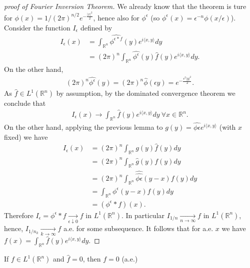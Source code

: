 \begin{proof}[proof of Fourier Inversion Theorem]
    We already know that the theorem is ture for \(\phi(x) = 1/(2\pi)^{n/2}e^{-\frac{|x|^2}{2}}\), hence also for \(\phi^{\epsilon}\) (so \(\phi^{\epsilon}(x) = \epsilon^{-n}\phi(x/\epsilon)\)). Consider the function \(I_{\epsilon}\) defined by 
    \begin{align*}
        I_{\epsilon}(x) &= \int_{\mathbb{R}^n} \widehat{\phi^{\epsilon\ast f}}(y)e^{i\langle x,y\rangle}dy \\
        &= (2\pi)^n\int_{\mathbb{R}^n} \widehat{\phi^{\epsilon}} (y) \hat{f}(y) e^{i\langle x,y \rangle}dy.
    \end{align*}
    On the other hand, 
    \begin{align*}
        (2\pi)^n\widehat{\phi^{\epsilon}}(y) = (2\pi)^n\hat{\phi}(\epsilon y) = e^{-\frac{\epsilon^2|y|^2}{2}}.
    \end{align*}
    As \(\hat{f}\in L^1(\mathbb{R}^n)\) by assumption, by the dominated convergence theorem we conclude that 
    \begin{align*}
        I_{\epsilon}(x) \rightarrow \int_{\mathbb{R}^n} \hat{f}(y)e^{i\langle x,y\rangle}dy \ \forall x\in\mathbb{R}^n.
    \end{align*}
    On the other hand, applying the previous lemma to \(g(y) = \widehat{\phi\epsilon} e^{i\langle x,y\rangle}\) (with \(x\) fixed) we have 
    \begin{align*}
        I_{\epsilon}(x) &= (2\pi)^n\int_{\mathbb{R}^n} g(y)\hat{f}(y)dy \\
        &= (2\pi)^n\int_{\mathbb{R}^n} \hat{g}(y)f(y)dy \\
        &= (2\pi)^n \int_{\mathbb{R}^n} \widehat{\widehat{\phi\epsilon}}(y-x)f(y)dy \\
        &= \int_{\mathbb{R}^n} \phi^{\epsilon}(y-x)f(y)dy \\
        &= (\phi^{\epsilon}\ast f)(x).
    \end{align*}
    Therefore \(I_{\epsilon} = \phi^{\epsilon}\ast f\xrightarrow[\epsilon\downarrow 0]{ }f\) in \(L^1(\mathbb{R}^n)\). In particular \(I_{1/n}\xrightarrow[n\rightarrow\infty]{ }f\) in \(L^1(\mathbb{R}^n)\), hence, \(I_{1/n_k}\xrightarrow[k\rightarrow\infty]{ }f\) a.e. for some subsequence. It follows that for a.e. \(x\) we have \(f(x) = \int_{\mathbb{R}^n} \hat{f}(y)e^{i\langle x,y\rangle}dy\). 
\end{proof}
\fi 
\begin{corollary}
    If \(f\in L^1(\mathbb{R}^n)\) and \(\hat{f}=0\), then \(f=0\) (a.e.)
\end{corollary}

